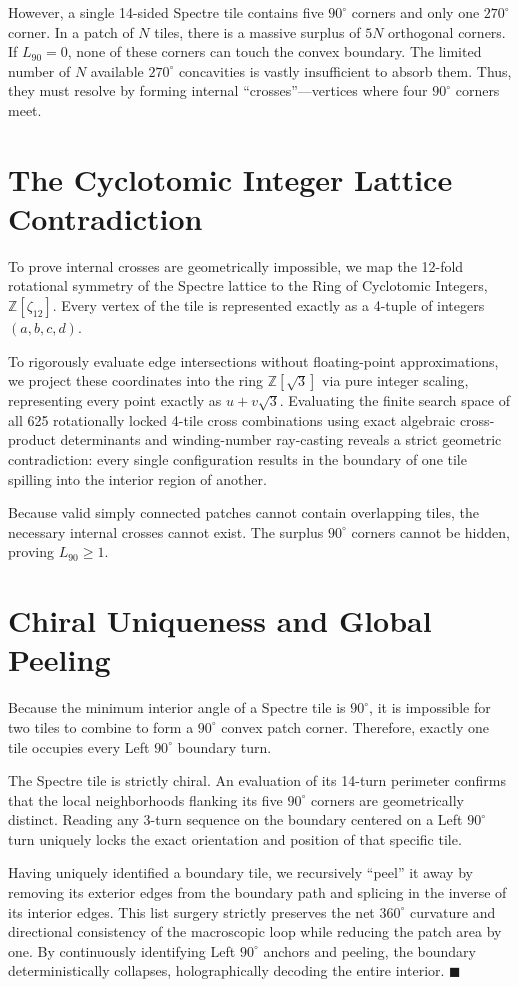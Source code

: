 \documentclass[11pt, a4paper]{amsart}
\begin{document}
However, a single 14-sided Spectre tile contains five $90^\circ$ corners and only one $270^\circ$ corner. In a patch of $N$ tiles, there is a massive surplus of $5N$ orthogonal corners. If $L_{90} = 0$, none of these corners can touch the convex boundary. The limited number of $N$ available $270^\circ$ concavities is vastly insufficient to absorb them. Thus, they must resolve by forming internal ``crosses''---vertices where four $90^\circ$ corners meet.

\section{The Cyclotomic Integer Lattice Contradiction}
To prove internal crosses are geometrically impossible, we map the 12-fold rotational symmetry of the Spectre lattice to the Ring of Cyclotomic Integers, $\mathbb{Z}[\zeta_{12}]$. Every vertex of the tile is represented exactly as a 4-tuple of integers $(a, b, c, d)$.

To rigorously evaluate edge intersections without floating-point approximations, we project these coordinates into the ring $\mathbb{Z}[\sqrt{3}]$ via pure integer scaling, representing every point exactly as $u + v\sqrt{3}$. Evaluating the finite search space of all 625 rotationally locked 4-tile cross combinations using exact algebraic cross-product determinants and winding-number ray-casting reveals a strict geometric contradiction: every single configuration results in the boundary of one tile spilling into the interior region of another.

Because valid simply connected patches cannot contain overlapping tiles, the necessary internal crosses cannot exist. The surplus $90^\circ$ corners cannot be hidden, proving $L_{90} \ge 1$.

\section{Chiral Uniqueness and Global Peeling}
Because the minimum interior angle of a Spectre tile is $90^\circ$, it is impossible for two tiles to combine to form a $90^\circ$ convex patch corner. Therefore, exactly one tile occupies every Left $90^\circ$ boundary turn.

The Spectre tile is strictly chiral. An evaluation of its 14-turn perimeter confirms that the local neighborhoods flanking its five $90^\circ$ corners are geometrically distinct. Reading any 3-turn sequence on the boundary centered on a Left $90^\circ$ turn uniquely locks the exact orientation and position of that specific tile.

Having uniquely identified a boundary tile, we recursively ``peel'' it away by removing its exterior edges from the boundary path and splicing in the inverse of its interior edges. This list surgery strictly preserves the net $360^\circ$ curvature and directional consistency of the macroscopic loop while reducing the patch area by one. By continuously identifying Left $90^\circ$ anchors and peeling, the boundary deterministically collapses, holographically decoding the entire interior. $\blacksquare$
\end{document}
